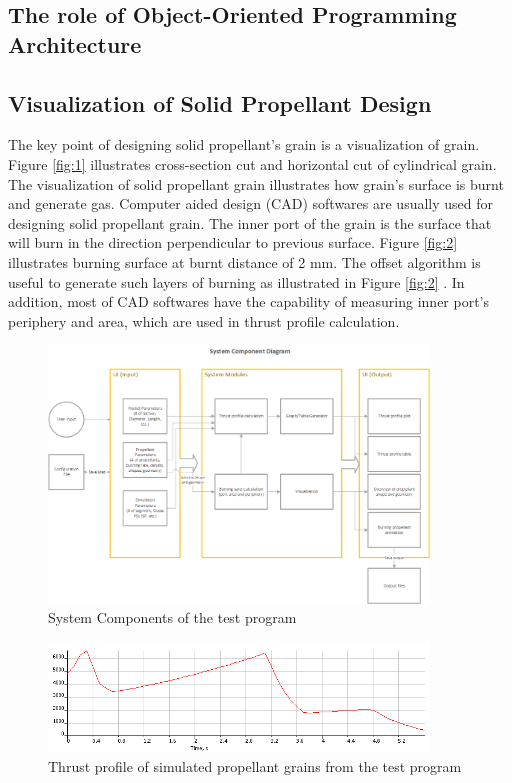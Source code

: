 \documentclass[conference]{IEEEtran}
\begin{document}
\subsection{The role of Object-Oriented Programming Architecture}

\subsection{Visualization of Solid Propellant Design}
The key point of designing solid propellant’s grain is a visualization of grain. Figure {\ref{fig:1}} illustrates cross-section cut and horizontal cut of cylindrical grain. The visualization of solid propellant grain illustrates how grain's surface is burnt and generate gas. Computer aided design (CAD) softwares are usually used for designing solid propellant grain. The inner port of the grain is the surface that will burn in the direction perpendicular to previous surface. Figure {\ref{fig:2}} illustrates burning surface at burnt distance of 2 mm. The offset algorithm is useful to generate such layers of burning as illustrated in Figure {\ref{fig:2}} {\cite{offset}}. In addition, most of CAD softwares have the capability of measuring inner port's periphery and area, which are used in thrust profile calculation.   




\begin{figure}[t]
\centering
\includegraphics[width=0.9\textwidth]{SystemComponents}
\caption{System Components of the test program}
\label{fig:3}
\end{figure}
\begin{figure}[t]
\centering
\includegraphics[width=0.9\textwidth]{thrust}
\caption{Thrust profile of simulated propellant grains from the test program}
\label{fig:5}
\end{figure}
\end{document}

